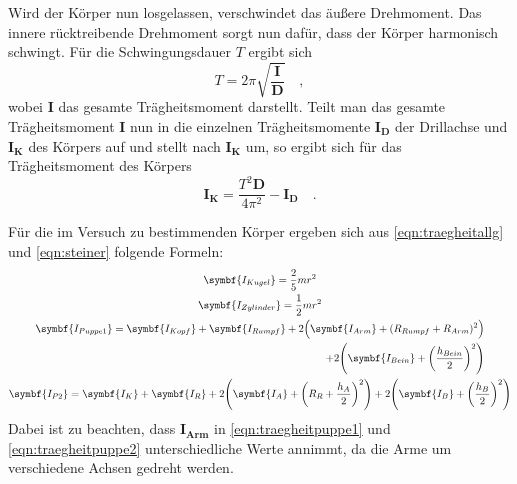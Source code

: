 Wird der Körper nun losgelassen, verschwindet das äußere Drehmoment. Das innere
rücktreibende Drehmoment sorgt nun dafür, dass der Körper harmonisch schwingt.
Für die Schwingungsdauer $T$ ergibt sich
\begin{equation}
  T=2\pi\sqrt{\frac{\symbf{I}}{\symbf{D}}}\quad,
  \label{eqn:schwingung}
\end{equation}
wobei $\symbf{I}$ das gesamte Trägheitsmoment darstellt. Teilt man das gesamte Trägheitsmoment
$\symbf{I}$ nun in die einzelnen Trägheitsmomente $\symbf{I_D}$ der Drillachse und
$\symbf{I_K}$ des Körpers auf und stellt nach $\symbf{I_K}$ um, so ergibt sich für
das Trägheitsmoment des Körpers
\begin{equation}
  \symbf{I_K}=\frac{T^2 \symbf{D}}{4\pi^2}-\symbf{I_D}\quad.
  \label{eqn:traegheitschwingung}
\end{equation}

Für die im Versuch zu bestimmenden Körper ergeben sich aus \eqref{eqn:traegheitallg}
und \eqref{eqn:steiner} folgende Formeln:
\begin{gather}
  \symbf{I_{Kugel}}=\frac{2}{5}mr^2
  \label{eqn:traegheitkugel} \\
  \symbf{I_{Zylinder}}=\frac{1}{2}mr^2
  \label{eqn:traegheitzylinder} \\
  \begin{split}
    \symbf{I_{Puppe1}}=\symbf{I_{Kopf}}+\symbf{I_{Rumpf}}
    +2\Bigl(\symbf{I_{Arm}}+(R_{Rumpf}+R_{Arm})^2\Bigr) \\
    +2\Biggl(\symbf{I_{Bein}}+\biggl(\frac{h_{Bein}}{2}\biggr)^2\Biggr)
    \label{eqn:traegheitpuppe1}
  \end{split}
  \\
  \begin{split}
    \symbf{I_{P2}}=\symbf{I_{K}}+\symbf{I_{R}}
    +2\Biggl(\symbf{I_{A}}+\biggl(R_{R}+\frac{h_{A}}{2}\biggr)^2\Biggr)
    +2\Biggl(\symbf{I_{B}}+\biggl(\frac{h_{B}}{2}\biggr)^2\Biggr)
    \label{eqn:traegheitpuppe2}
  \end{split}
\end{gather}
Dabei ist zu beachten, dass $\symbf{I_{Arm}}$ in \eqref{eqn:traegheitpuppe1} und
\eqref{eqn:traegheitpuppe2} unterschiedliche Werte annimmt, da die Arme um verschiedene
Achsen gedreht werden.
